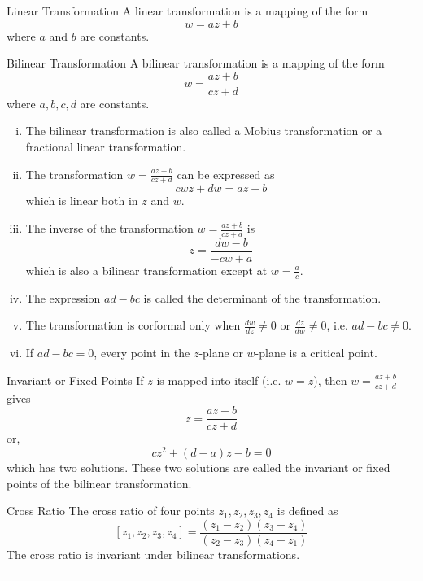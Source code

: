 \begin{definition}{Linear Transformation}{}
    A linear transformation is a mapping of the form \[
        w = az + b
    \] where $a$ and $b$ are constants.
\end{definition}

\begin{definition}{Bilinear Transformation}{}
    A bilinear transformation is a mapping of the form \[
        w = \frac{az+b}{cz+d}
    \] where $a,b,c,d$ are constants. \\
    \begin{enumerate}[(i)]
        \item The bilinear transformation is also called a Mobius transformation or a fractional linear transformation.
        \item The transformation $\displaystyle w = \frac{az+b}{cz+d}$ can be expressed as \[
            cwz + dw = az + b
        \] which is linear both in $z$ and $w$.
        \item The inverse of the transformation $\displaystyle w = \frac{az+b}{cz+d}$ is \[
            z = \frac{dw-b}{-cw+a}
        \] which is also a bilinear transformation except at $w = \frac{a}{c}$.
        \item The expression $ad - bc$ is called the determinant of the transformation.
        \item The transformation is corformal only when $\frac{dw}{dz} \neq 0$ or $\frac{dz}{dw} \neq 0$, i.e. $ad-bc \neq 0$.
        \item If $ad - bc = 0$, every point in the $z$-plane or $w$-plane is a critical point.
    \end{enumerate}
\end{definition}

\begin{definition}{Invariant or Fixed Points}{}
    If $z$ is mapped into itself (i.e. $w=z$), then $\displaystyle w = \frac{az+b}{cz+d}$ gives \[
        z = \frac{az+b}{cz+d}
    \] or, \[
        cz^2 + (d-a)z - b = 0
    \] which has two solutions. These two solutions are called the invariant or fixed points of the bilinear transformation.
\end{definition}

\begin{definition}{Cross Ratio}{}
    The cross ratio of four points $z_1, z_2, z_3, z_4$ is defined as \[
        [z_1, z_2, z_3, z_4] = \frac{(z_1-z_2)(z_3-z_4)}{(z_2-z_3)(z_4-z_1)}
    \] The cross ratio is invariant under bilinear transformations.
\end{definition}

\vspace{20pt}\rule{3in}{1pt}
